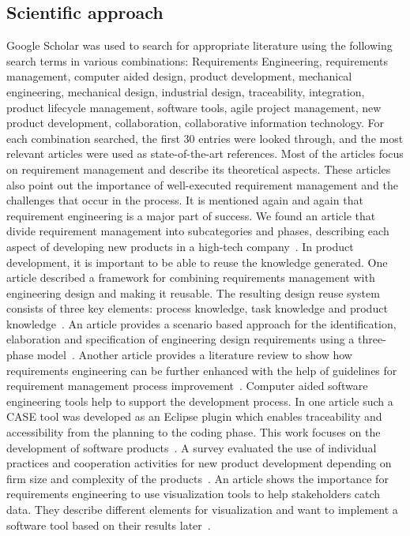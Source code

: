     \subsection*{Scientific approach}
    Google Scholar was used to search for appropriate literature using the following search terms in various combinations: Requirements Engineering, requirements management, computer aided design, product development, mechanical engineering, mechanical design, industrial design, traceability, integration, product lifecycle management, software tools, agile project management, new product development, collaboration, collaborative information technology. For each combination searched, the first 30 entries were looked through, and the most relevant articles were used as state-of-the-art references. Most of the articles focus on requirement management and describe its theoretical aspects. These articles also point out the importance of well-executed requirement management and the challenges that occur in the process. It is mentioned again and again that requirement engineering is a major part of success.
    We found an article that divide requirement management into subcategories and phases, describing each aspect of developing new products in a high-tech company~\cite{Ahti2005}.
    In product development, it is important to be able to reuse the knowledge generated. One article described a framework for combining requirements management with engineering design and making it reusable. The resulting design reuse system consists of three key elements: process knowledge, task knowledge and product knowledge~\cite{BAXTER2008585}.
    An article provides a scenario based approach for the identification, elaboration and specification of engineering design requirements using a three-phase model~\cite{liu2012scenario}.
    Another article provides a literature review to show how requirements engineering can be further enhanced with the help of guidelines for requirement management process improvement~\cite{Kauppinen2005}.
    Computer aided software engineering tools help to support the development process. In one article such a CASE tool was developed as an Eclipse plugin which enables traceability and accessibility from the planning to the coding phase. This work focuses on the development of software products~\cite{6976693}.
    A survey evaluated the use of individual practices and cooperation activities for new product development depending on firm size and complexity of the products~\cite{sanchez2003flexibility}.
    An article shows the importance for requirements engineering to use visualization tools to help stakeholders catch data. They describe different elements for visualization and want to implement a software tool based on their results later~\cite{RICHTER2020271}.
